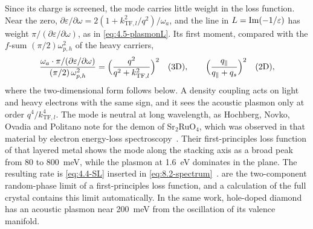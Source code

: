 Since its charge is screened, the mode carries little weight in the loss function. Near the zero, $\partial\varepsilon/\partial\omega = 2(1 + k_{\mathrm{TF},l}^2/q^2)/\omega_a$, and the line in $L = \operatorname{Im}(-1/\varepsilon)$ has weight $\pi/(\partial\varepsilon/\partial\omega)$, as in \cref{eq:4.5-plasmonL}. Its first moment, compared with the $f$-sum $(\pi/2)\omega_{p,h}^2$ of the heavy carriers,
\begin{equation}
  \frac{\omega_a\cdot\pi/(\partial\varepsilon/\partial\omega)}{(\pi/2)\,\omega_{p,h}^2} = \Bigl(\frac{q^2}{q^2 + k_{\mathrm{TF},l}^2}\Bigr)^2 \quad (\text{3D}) ,
  \qquad
  \Bigl(\frac{q_\parallel}{q_\parallel + q_s}\Bigr)^2 \quad (\text{2D}) ,
  \label{eq:16.2-share}
\end{equation}
where the two-dimensional form follows below. A density coupling acts on light and heavy electrons with the same sign, and it sees the acoustic plasmon only at order $q^4/k_{\mathrm{TF},l}^4$. The mode is neutral at long wavelength, as Hochberg, Novko, Ovadia and Politano note for the demon of Sr$_2$RuO$_4$, which was observed in that material by electron energy-loss spectroscopy~\cite{hochberg2025unconventional}. Their first-principles loss function of that layered metal shows the mode along the stacking axis as a broad peak from 80 to \SI{800}{meV}, while the plasmon at \SI{1.6}{eV} dominates in the plane. The resulting rate is \cref{eq:4.4-SL} inserted in \cref{eq:8.2-spectrum}~\cite[Eqs.~(1), (2)]{hochberg2025unconventional}.  are the two-component random-phase limit of a first-principles loss function, and a calculation of the full crystal contains this limit automatically. In the same work, hole-doped diamond has an acoustic plasmon near \SI{200}{meV} from the oscillation of its valence manifold.

